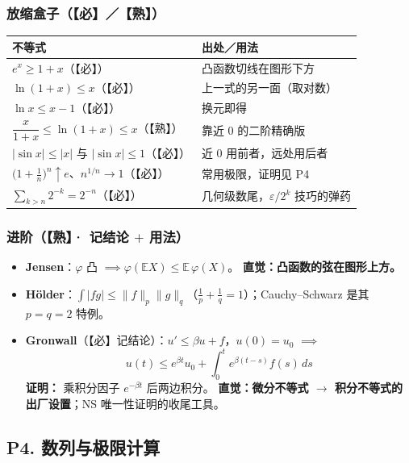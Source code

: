 \subsubsection{放缩盒子（【必】／【熟】）}

\begin{center}
\begin{tabular}{ll}
\toprule
\textbf{不等式} & \textbf{出处／用法} \\
\midrule
$e^x\ge 1+x$（【必】） & 凸函数切线在图形下方 \\
$\ln(1+x)\le x$（【必】） & 上一式的另一面（取对数） \\
$\ln x\le x-1$（【必】） & 换元即得 \\
$\dfrac{x}{1+x}\le\ln(1+x)\le x$（【熟】） & 靠近 $0$ 的二阶精确版 \\
$|\sin x|\le|x|$ 与 $|\sin x|\le1$（【必】） & 近 $0$ 用前者，远处用后者 \\
$\big(1+\frac1n\big)^n\uparrow e$、$n^{1/n}\to1$（【必】） & 常用极限，证明见 P4 \\
$\sum_{k>n}2^{-k}=2^{-n}$（【必】） & 几何级数尾，$\varepsilon/2^k$ 技巧的弹药 \\
\bottomrule
\end{tabular}
\end{center}

\subsubsection{进阶（【熟】· 记结论 $+$ 用法）}

\begin{itemize}
  \item \textbf{Jensen}：$\varphi$ 凸 $\implies \varphi(\mathbb E X)\le\mathbb E\,\varphi(X)$。
        \textbf{直觉：凸函数的弦在图形上方。}
  \item \textbf{Hölder}：$\int|fg|\le\|f\|_p\|g\|_q$（$\frac1p+\frac1q=1$）；Cauchy--Schwarz 是其 $p=q=2$ 特例。
  \item \textbf{Gronwall}（【必】记结论）：$u'\le\beta u+f$，$u(0)=u_0$ $\implies$
        \[
        u(t)\le e^{\beta t}u_0+\int_0^t e^{\beta(t-s)}f(s)\,ds
        \]
        \textbf{证明：} 乘积分因子 $e^{-\beta t}$ 后两边积分。
        \textbf{直觉：微分不等式 $\to$ 积分不等式的出厂设置}；NS 唯一性证明的收尾工具。
\end{itemize}

\subsection{P4. 数列与极限计算}

